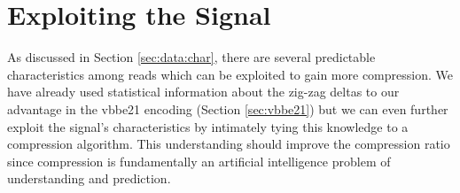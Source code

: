 \section{Exploiting the Signal}

As discussed in Section
\ref{sec:data:char},
there are several predictable characteristics among reads which can be exploited
to gain more compression.
We have already used statistical information about the zig-zag deltas to our
advantage in the vbbe21 encoding (Section \ref{sec:vbbe21}) but we can even
further exploit the signal's characteristics by intimately tying this knowledge
to a compression algorithm. This understanding should improve the compression
ratio since compression is fundamentally an artificial intelligence problem of
understanding and prediction.






